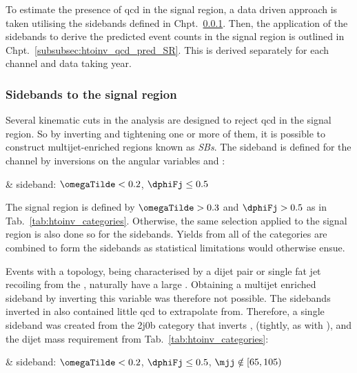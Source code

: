 To estimate the presence of \acrshort{qcd} in the signal region, a data driven approach is taken utilising the sidebands defined in Chpt.~\ref{subsubsec:htoinv_sidebands}. Then, the application of the sidebands to derive the predicted event counts in the signal region is outlined in Chpt.~\ref{subsubsec:htoinv_qcd_pred_SR}. This is derived separately for each channel and data taking year.




\subsubsection{Sidebands to the signal region}
\label{subsubsec:htoinv_sidebands}

Several kinematic cuts in the analysis are designed to reject \acrshort{qcd} in the signal region. So by inverting and tightening one or more of them, it is possible to construct multijet-enriched regions known as \emph{\glspl{SB}}. The sideband is defined for the \ttH channel by inversions on the angular variables \omegaTilde and \dphiFj:

\medskip
\begin{easylist}[itemize]
    \easylistprops
    & \ttH sideband: $\omegaTilde < \text{0.2}$, $\dphiFj \leq \text{0.5}$
\end{easylist}

\medskip

\noindent{}The signal region is defined by $\omegaTilde > \text{0.3}$ and $\dphiFj > \text{0.5}$ as in Tab.~\ref{tab:htoinv_categories}. Otherwise, the same selection applied to the signal region is also done so for the sidebands. Yields from all of the \ttH categories are combined to form the sidebands as statistical limitations would otherwise ensue.

Events with a \VH topology, being characterised by a dijet pair or single fat jet recoiling from the \ptvecmiss, naturally have a large \mindphiJetMet. Obtaining a multijet enriched sideband by inverting this variable was therefore not possible. The sidebands inverted in \omegaTilde also contained little \acrshort{qcd} to extrapolate from. Therefore, a single sideband was created from the 2j0b category that inverts \mindphi, \omegaTilde (tightly, as with \ttH), and the dijet mass requirement from Tab.~\ref{tab:htoinv_categories}:

\medskip
\begin{easylist}[itemize]
    \easylistprops
    & \VH sideband: $\omegaTilde < \text{0.2}$, $\dphiFj \leq \text{0.5}$, $\mjj \notin [\text{65}, \text{105})$
\end{easylist}

